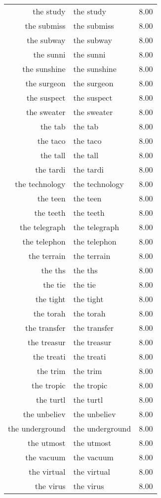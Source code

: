 \begin{table}[ht]
\begin{tabular}{rlr}
  the study & the study & 8.00 \\ 
  the submiss & the submiss & 8.00 \\ 
  the subway & the subway & 8.00 \\ 
  the sunni & the sunni & 8.00 \\ 
  the sunshine & the sunshine & 8.00 \\ 
  the surgeon & the surgeon & 8.00 \\ 
  the suspect & the suspect & 8.00 \\ 
  the sweater & the sweater & 8.00 \\ 
  the tab & the tab & 8.00 \\ 
  the taco & the taco & 8.00 \\ 
  the tall & the tall & 8.00 \\ 
  the tardi & the tardi & 8.00 \\ 
  the technology & the technology & 8.00 \\ 
  the teen & the teen & 8.00 \\ 
  the teeth & the teeth & 8.00 \\ 
  the telegraph & the telegraph & 8.00 \\ 
  the telephon & the telephon & 8.00 \\ 
  the terrain & the terrain & 8.00 \\ 
  the ths & the ths & 8.00 \\ 
  the tie & the tie & 8.00 \\ 
  the tight & the tight & 8.00 \\ 
  the torah & the torah & 8.00 \\ 
  the transfer & the transfer & 8.00 \\ 
  the treasur & the treasur & 8.00 \\ 
  the treati & the treati & 8.00 \\ 
  the trim & the trim & 8.00 \\ 
  the tropic & the tropic & 8.00 \\ 
  the turtl & the turtl & 8.00 \\ 
  the unbeliev & the unbeliev & 8.00 \\ 
  the underground & the underground & 8.00 \\ 
  the utmost & the utmost & 8.00 \\ 
  the vacuum & the vacuum & 8.00 \\ 
  the virtual & the virtual & 8.00 \\ 
  the virus & the virus & 8.00 \\ 

\end{tabular}
\end{table}
